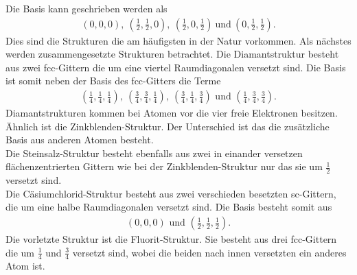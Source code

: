 Die Basis kann geschrieben werden als
\begin{align}
	\left( 0, 0, 0\right),\ \left( \frac{1}{2},\frac{1}{2},0\right),\ \left(\frac{1}{2}, 0 , \frac{1}{2}\right)\ \text{und}\ \left(0,\frac{1}{2},\frac{1}{2}\right).
\end{align}
Dies sind die Strukturen die am häufigsten in der Natur vorkommen. Als nächstes werden zusammengesetzte Strukturen betrachtet.
Die Diamantstruktur besteht aus zwei fcc-Gittern die um eine viertel Raumdiagonalen versetzt sind. Die Basis ist somit neben der Basis des fcc-Gitters die Terme
\begin{align}
 \left(\frac{1}{4},\frac{1}{4},\frac{1}{4}\right),\ \left(\frac{3}{4},\frac{3}{4},\frac{1}{4}\right),\ \left(\frac{3}{4},\frac{1}{4},\frac{3}{4}\right)\text{ und } \left(\frac{1}{4},\frac{3}{4},\frac{3}{4}\right).
\end{align}
Diamantstrukturen kommen bei Atomen vor die vier freie Elektronen besitzen.\\
Ähnlich ist die Zinkblenden-Struktur. Der Unterschied ist das die zusätzliche Basis aus anderen Atomen besteht.\\
Die Steinsalz-Struktur besteht ebenfalls aus zwei in einander versetzen flächenzentrierten Gittern wie bei der Zinkblenden-Struktur nur das sie um $\frac{1}{2}$ versetzt sind.\\
Die Cäsiumchlorid-Struktur besteht aus zwei verschieden besetzten sc-Gittern, die um eine halbe Raumdiagonalen versetzt sind. Die Basis besteht somit aus 
\begin{align}
	\left(0,0,0\right)\text{ und }\left(\frac{1}{2},\frac{1}{2},\frac{1}{2}\right).
\end{align}
Die vorletzte Struktur ist die Fluorit-Struktur. Sie besteht aus drei fcc-Gittern die um $\frac{1}{4}$ und $\frac{3}{4}$ versetzt sind, wobei die beiden nach innen versetzten ein anderes Atom ist.

